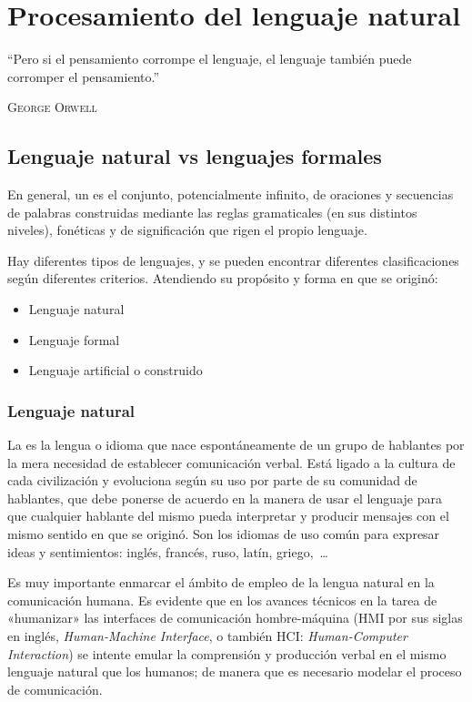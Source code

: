 
\chapter{Procesamiento del lenguaje natural}

\epigraph{``Pero si el pensamiento corrompe el lenguaje, el lenguaje también puede corromper el pensamiento.''}{\textsc{George Orwell}}

\section{Lenguaje natural vs lenguajes formales}

En general, un  es el conjunto, potencialmente infinito, de oraciones y secuencias de palabras construidas mediante las reglas gramaticales (en sus distintos niveles), fonéticas y de significación que rigen el propio lenguaje.

Hay diferentes tipos de lenguajes, y se pueden encontrar diferentes clasificaciones según diferentes criterios. Atendiendo su propósito y forma en que se originó:
\nopagebreak
\begin{itemize}
\item Lenguaje natural
\item Lenguaje formal
\item Lenguaje artificial o construido
\end{itemize}

\subsection{Lenguaje natural}

La  es la lengua o idioma que nace espontáneamente de un grupo de hablantes por la mera necesidad de establecer comunicación verbal. Está ligado a la cultura de cada civilización y evoluciona según su uso por parte de su comunidad de hablantes, que debe ponerse de acuerdo en la manera de usar el lenguaje para que cualquier hablante del mismo pueda interpretar y producir mensajes con el mismo sentido en que se originó. Son los idiomas de uso común para expresar ideas y sentimientos: inglés, francés, ruso, latín, griego,~\ldots

Es muy importante enmarcar el ámbito de empleo de la lengua natural en la comunicación humana. Es evidente que en los avances técnicos en la tarea de «humanizar» las interfaces de comunicación hombre-máquina (HMI por sus siglas en inglés, \emph{Human-Machine Interface}, o también HCI: \emph{Human-Computer Interaction}) se intente emular la comprensión y producción verbal en el mismo lenguaje natural que los humanos; de manera que es necesario modelar el proceso de comunicación.

